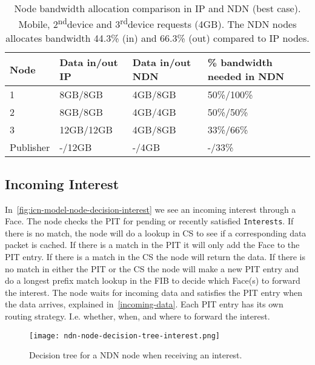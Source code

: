 \begin{table}[h]
  \begin{tabular}{llll}
  Node        & Data in/out IP  & Data in/out NDN   & \% bandwidth needed in NDN    \\ \hline
  1           & 8GB/8GB         & 4GB/8GB           & 50\%/100\%      \\ %
  2           & 8GB/8GB         & 4GB/4GB           & 50\%/50\%     \\ %
  3           & 12GB/12GB       & 4GB/8GB           & 33\%/66\%     \\ %
  Publisher   & -/12GB          & -/4GB             & -/33\%        \\ %
  \end{tabular}
  \caption{Node bandwidth allocation comparison in IP and NDN (best case). Mobile, 2\textsuperscript{nd}device and 3\textsuperscript{rd}device requests \protect{} (4GB). The NDN nodes allocates bandwidth 44.3\% (in) and 66.3\% (out) compared to IP nodes.}
  \label{tbl:node_comparison-ip-ndn}
\end{table}
 
\subsection{Incoming Interest}\label{incoming-interest}
In~\autoref{fig:icn-model-node-decision-interest} we see an incoming \gls{interest} through a Face. 
The node checks the \gls{PIT} for pending or recently satisfied \texttt{Interests}. 
If there is no match, the node will do a lookup in \gls{CS} to see if a corresponding \gls{data} packet is cached. 
If there is a match in the \gls{PIT} it will only add the Face to the \gls{PIT} entry. If there is a match in the \gls{CS} the node will return the \gls{data}. 
If there is no match in either the \gls{PIT} or the \gls{CS} the node will make a new \gls{PIT} entry and do a longest prefix match lookup in the \gls{FIB} to decide which Face(s) to forward the \gls{interest}.
The node waits for incoming \gls{data} and satisfies the \gls{PIT} entry when the \gls{data} arrives, explained in~\autoref{incoming-data}. 
Each \gls{PIT} entry has its own routing strategy. 
I.e. whether, when, and where to forward the \gls{interest}.
\begin{figure}[H]
  \centering
  \texttt{[image: ndn-node-decision-tree-interest.png]}
  \caption{Decision tree for a NDN node when receiving an \gls{interest}.}
  \label{fig:icn-model-node-decision-interest}
\end{figure}

